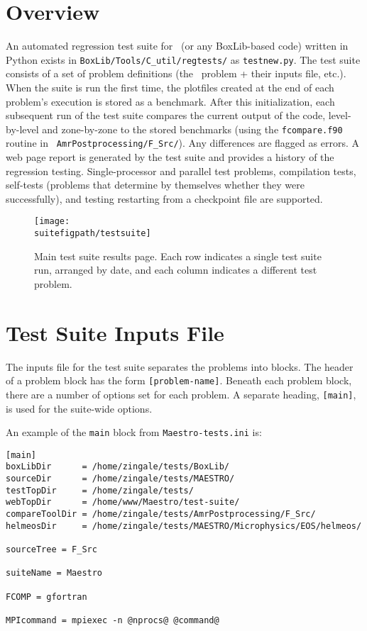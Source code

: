 \section{Overview}

An automated regression test suite for \maestro\ (or any BoxLib-based
code) written in Python exists in {\tt BoxLib/Tools/C\_util/regtests/}
as {\tt testnew.py}.  The test suite consists of a set of problem
definitions (the \maestro\ problem + their inputs file, etc.).  When
the suite is run the first time, the plotfiles created at the end of
each problem's execution is stored as a benchmark.  After this
initialization, each subsequent run of the test suite compares the
current output of the code, level-by-level and zone-by-zone to the
stored benchmarks (using the {\tt fcompare.f90} routine in {\tt
  AmrPostprocessing/F\_Src/}).  Any differences are flagged as errors.
A web page report is generated by the test suite and provides a
history of the regression testing.  Single-processor and parallel test
problems, compilation tests, self-tests (problems that determine by
themselves whether they were successfully), and testing restarting
from a checkpoint file are supported.

\begin{figure}[t]
\centering
\texttt{[image: \\suitefigpath/testsuite]}
\caption{\label{fig:test_suite_main} Main test suite results page.  Each 
row indicates a single test suite run, arranged by date, and each column
indicates a different test problem. }
\end{figure}

\section{Test Suite Inputs File}

The inputs file for the test suite separates the problems into blocks.
The header of a problem block has the form {\tt [problem-name]}.
Beneath each problem block, there are a number of options set for each
problem.  A separate heading, {\tt [main]}, is used for the suite-wide
options.

An example of the {\tt main} block from {\tt Maestro-tests.ini} is:
\begin{lstlisting}
[main]
boxLibDir      = /home/zingale/tests/BoxLib/
sourceDir      = /home/zingale/tests/MAESTRO/
testTopDir     = /home/zingale/tests/
webTopDir      = /home/www/Maestro/test-suite/
compareToolDir = /home/zingale/tests/AmrPostprocessing/F_Src/
helmeosDir     = /home/zingale/tests/MAESTRO/Microphysics/EOS/helmeos/

sourceTree = F_Src

suiteName = Maestro

FCOMP = gfortran

MPIcommand = mpiexec -n @nprocs@ @command@
\end{lstlisting}

